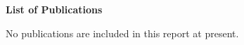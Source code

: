 \label{page:pub}
\begin{center}
\textbf{\Large List of Publications}
\end{center}

\vspace*{25pt}

\noindent No publications are included in this report at present.

\newpage
